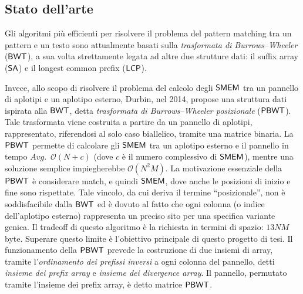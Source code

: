 \documentclass[a4paper,11pt, oneside,italian]{article}
\def\SA{\mbox{\rm {\sf SA}}}
\def\LCP{\mbox{\rm {\sf LCP}}}
\def\LCP{\mbox{\rm {\sf LCP}}}
\def\BWT{\mbox{\rm {\sf BWT}}}
\def\PBWT{\mbox{\rm {\sf PBWT}}}
\def\SMEM{\mbox{\rm {\sf SMEM}}}
\begin{document}
\subsection*{Stato dell'arte}
Gli algoritmi più efficienti per risolvere il problema del pattern matching tra
un pattern e un testo 
sono attualmente basati sulla \textit{trasformata di Burrows--Wheeler} ($\BWT$),
a sua 
volta strettamente legata ad altre due strutture dati: il suffix array ($\SA$) e
il longest common prefix ($\LCP$). 

Invece, allo scopo di risolvere il problema del calcolo degli $\SMEM$ tra un
pannello di aplotipi e un aplotipo esterno,
Durbin, nel 2014, propose una struttura dati ispirata alla $\BWT$, detta
\textit{trasformata di Burrows--Wheeler posizionale} ($\PBWT$). Tale trasformata
viene costruita a partire da un pannello di aplotipi, rappresentato, riferendosi
al solo caso biallelico, tramite una matrice binaria.
La $\PBWT$ permette di calcolare gli $\SMEM$ tra
un aplotipo esterno e il pannello in tempo $Avg.\,\,\,\mathcal{O}(N+c)$ (dove 
$c$ è il numero complessivo di $\SMEM$), mentre 
una soluzione semplice impiegherebbe $\mathcal{O}(N^2M)$.
La motivazione essenziale della $\PBWT$ è considerare match, e quindi
$\SMEM$, 
dove anche le posizioni di inizio e fine sono rispettate.
Tale vincolo, da cui deriva il termine
``posizionale'', non è soddisfacibile dalla $\BWT$ ed è dovuto al fatto che ogni 
colonna (o indice dell'aplotipo esterno) rappresenta un preciso sito per una
specifica 
variante genica. Il tradeoff di questo algoritmo è la richiesta in termini di
spazio: $13NM$ 
byte. Superare questo limite è l'obiettivo principale di
questo progetto di tesi.
Il funzionamento della $\PBWT$ prevede la costruzione di due insiemi di
array, tramite 
l'\textit{ordinamento dei prefissi inversi} a ogni colonna del pannello, detti
\textit{insieme dei prefix array} e \textit{insieme dei divergence array}.
Il pannello, permutato tramite l'insieme dei prefix array, è
detto matrice $\PBWT$.
\end{document}
